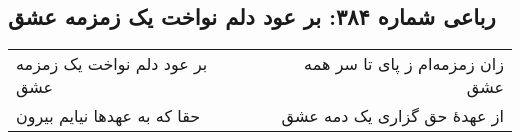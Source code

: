 \begin{center}
\section*{رباعی شماره ۳۸۴: بر عود دلم نواخت یک زمزمه عشق}
\label{sec:sh384}
\begin{longtable}{l p{0.5cm} r}
بر عود دلم نواخت یک زمزمه عشق
&&
زان زمزمه‌ام ز پای تا سر همه عشق
\\
حقا که به عهدها نیایم بیرون
&&
از عهدهٔ حق گزاری یک دمه عشق
\\
\end{longtable}
\end{center}
